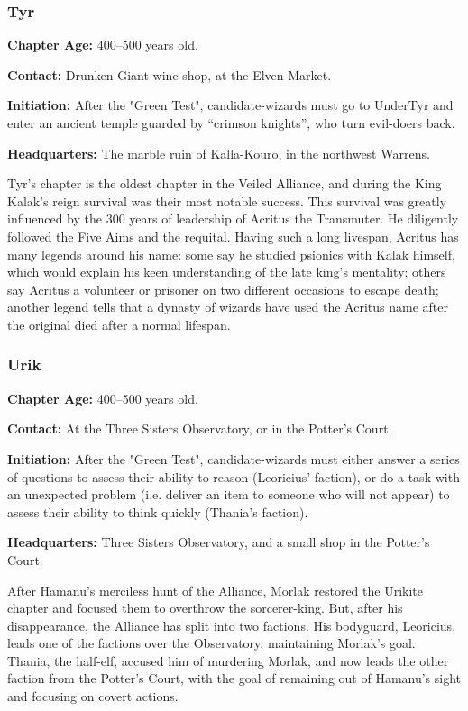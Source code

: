 \subsubsection{Tyr}
\textbf{Chapter Age:} 400--500 years old.

\textbf{Contact:} Drunken Giant wine shop, at the Elven Market.

\textbf{Initiation:} After the "Green Test", candidate-wizards must go to UnderTyr and enter an ancient temple guarded by ``crimson knights'', who turn evil-doers back.

\textbf{Headquarters:} The marble ruin of Kalla-Kouro, in the northwest Warrens.

Tyr's chapter is the oldest chapter in the Veiled Alliance, and during the King Kalak's reign survival was their most notable success. This survival was greatly influenced by the 300 years of leadership of Acritus the Transmuter. He diligently followed the Five Aims and the requital. Having such a long livespan, Acritus has many legends around his name: some say he studied psionics with Kalak himself, which would explain his keen understanding of the late king's mentality; others say Acritus  a volunteer or prisoner on two different occasions to escape death; another legend tells that a dynasty of wizards have used the Acritus name after the original died after a normal lifespan.


\subsubsection{Urik}
\textbf{Chapter Age:} 400--500 years old.

\textbf{Contact:} At the Three Sisters Observatory, or in the Potter's Court.

\textbf{Initiation:} After the "Green Test", candidate-wizards must either answer a series of questions to assess their ability to reason (Leoricius' faction), or do a task with an unexpected problem (i.e. deliver an item to someone who will not appear) to assess their ability to think quickly (Thania's faction).

\textbf{Headquarters:} Three Sisters Observatory, and a small shop in the Potter's Court.

After Hamanu's merciless hunt of the Alliance, Morlak restored the Urikite chapter and focused them to overthrow the sorcerer-king. But, after his disappearance, the Alliance has split into two factions. His bodyguard, Leoricius, leads one of the factions over the Observatory, maintaining Morlak's goal. Thania, the half-elf, accused him of murdering Morlak, and now leads the other faction from the Potter's Court, with the goal of remaining out of Hamanu's sight and focusing on covert actions.

